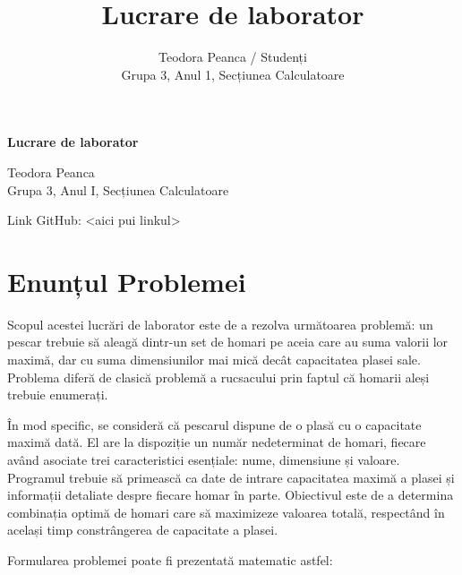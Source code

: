\documentclass[a4paper,12pt]{article}
\title{Lucrare de laborator}
\author{Teodora Peanca / Studenți \\
Grupa 3, Anul 1, Secțiunea Calculatoare}
\begin{document}
\begin{titlepage}
    \centering
    \vspace*{1cm}
    
    \Huge
    \textbf{Lucrare de laborator}
    
    \vspace{2cm}
    
    \LARGE
    Teodora Peanca \\
    Grupa 3, Anul I, Secțiunea Calculatoare
    
    \vfill
    
\end{titlepage}

\newpage

\renewcommand{\contentsname}{Cuprins}
\tableofcontents
Link GitHub: <aici pui linkul>
\newpage

\section{Enunțul Problemei}

Scopul acestei lucrări de laborator este de a rezolva următoarea problemă: un pescar trebuie să aleagă dintr-un set de homari pe aceia care au suma valorii lor maximă, dar cu suma dimensiunilor mai mică decât capacitatea plasei sale. Problema diferă de clasică problemă a rucsacului prin faptul că homarii aleși trebuie enumerați.

În mod specific, se consideră că pescarul dispune de o plasă cu o capacitate maximă dată. El are la dispoziție un număr nedeterminat de homari, fiecare având asociate trei caracteristici esențiale: nume, dimensiune și valoare. Programul trebuie să primească ca date de intrare capacitatea maximă a plasei și informații detaliate despre fiecare homar în parte. Obiectivul este de a determina combinația optimă de homari care să maximizeze valoarea totală, respectând în același timp constrângerea de capacitate a plasei.

Formularea problemei poate fi prezentată matematic astfel:
\end{document}
